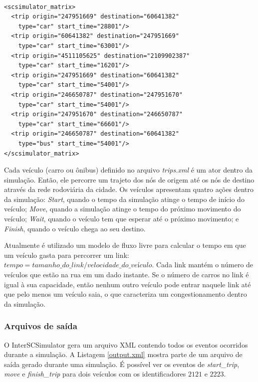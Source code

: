 \begin{lstlisting}[style=myxml, caption={Exemplo de arquivo trips.xml que define a rede rodoviária da cidade. Fonte: \citet{mabs2017}}, label=trips.xml]

<scsimulator_matrix>
  <trip origin="247951669" destination="60641382"
    type="car" start_time="28801"/>
  <trip origin="60641382" destination="247951669"
    type="car" start_time="63001"/>
  <trip origin="4511105625" destination="2109902387"
    type="car" start_time="16201"/>
  <trip origin="247951669" destination="60641382"
    type="car" start_time="54001"/>
  <trip origin="246650787" destination="247951670"
    type="car" start_time="54001"/>
  <trip origin="247951670" destination="246650787"
    type="car" start_time="66601"/>
  <trip origin="246650787" destination="60641382"
    type="bus" start_time="54001"/>
</scsimulator_matrix>
\end{lstlisting}

  Cada veículo (carro ou ônibus) definido no arquivo \emph{trips.xml} é um ator
dentro da simulação.  Então, ele percorre um trajeto dos nós de origem até os
nós de destino através da rede rodoviária da cidade. Os veículos apresentam quatro
ações dentro da simulação: \emph{Start}, quando o tempo da simulação atinge o
tempo de início do veículo; \emph{Move}, quando a simulação atinge o tempo do
próximo movimento do veículo; \emph{Wait}, quando o veículo tem que esperar até
o próximo movimento; e \emph{Finish}, quando o veículo chega ao seu destino.

  Atualmente é utilizado um modelo de fluxo livre para calcular o tempo em que
um veículo gasta para percorrer um link: $tempo = tamanho\_do\_link/velocidade\_do\_veículo$.
Cada link mantém o número de veículos que estão na rua em um dado instante. Se o número
de carros no link é igual à sua capacidade, então nenhum outro veículo pode entrar naquele
link até que pelo menos um veículo saia, o que caracteriza um congestionamento
dentro da simulação. 

\subsubsection{Arquivos de saída}

O InterSCSimulator gera um arquivo XML contendo todos os eventos ocorridos
durante a simulação. A Listagem \ref{output.xml} mostra parte de um arquivo de
saída gerado durante uma simulação. É possível ver os eventos de
\emph{start\_trip}, \emph{move} e \emph{finish\_trip} para dois veículos com os
identificadores $2121$ e $2223$.

